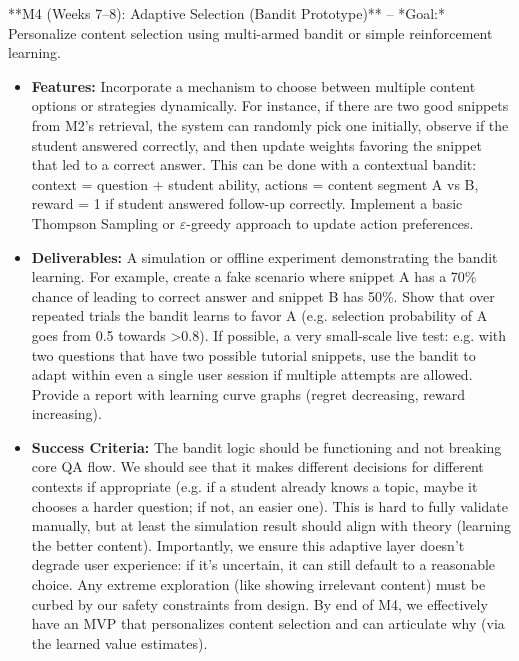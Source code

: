 \documentclass[11pt]{article}
\begin{document}
**M4 (Weeks 7–8): Adaptive Selection (Bandit Prototype)** – *Goal:* Personalize content selection using multi-armed bandit or simple reinforcement learning.
  \begin{itemize}
    \item \textbf{Features:} Incorporate a mechanism to choose between multiple content options or strategies dynamically. For instance, if there are two good snippets from M2’s retrieval, the system can randomly pick one initially, observe if the student answered correctly, and then update weights favoring the snippet that led to a correct answer. This can be done with a contextual bandit: context = question + student ability, actions = content segment A vs B, reward = 1 if student answered follow-up correctly. Implement a basic Thompson Sampling or $\varepsilon$-greedy approach to update action preferences.
    \item \textbf{Deliverables:} A simulation or offline experiment demonstrating the bandit learning. For example, create a fake scenario where snippet A has a 70\% chance of leading to correct answer and snippet B has 50\%. Show that over repeated trials the bandit learns to favor A (e.g. selection probability of A goes from 0.5 towards >0.8). If possible, a very small-scale live test: e.g. with two questions that have two possible tutorial snippets, use the bandit to adapt within even a single user session if multiple attempts are allowed. Provide a report with learning curve graphs (regret decreasing, reward increasing).
    \item \textbf{Success Criteria:} The bandit logic should be functioning and not breaking core QA flow. We should see that it makes different decisions for different contexts if appropriate (e.g. if a student already knows a topic, maybe it chooses a harder question; if not, an easier one). This is hard to fully validate manually, but at least the simulation result should align with theory (learning the better content). Importantly, we ensure this adaptive layer doesn’t degrade user experience: if it’s uncertain, it can still default to a reasonable choice. Any extreme exploration (like showing irrelevant content) must be curbed by our safety constraints from design. By end of M4, we effectively have an MVP that personalizes content selection and can articulate why (via the learned value estimates).
  \end{itemize}
\end{document}
